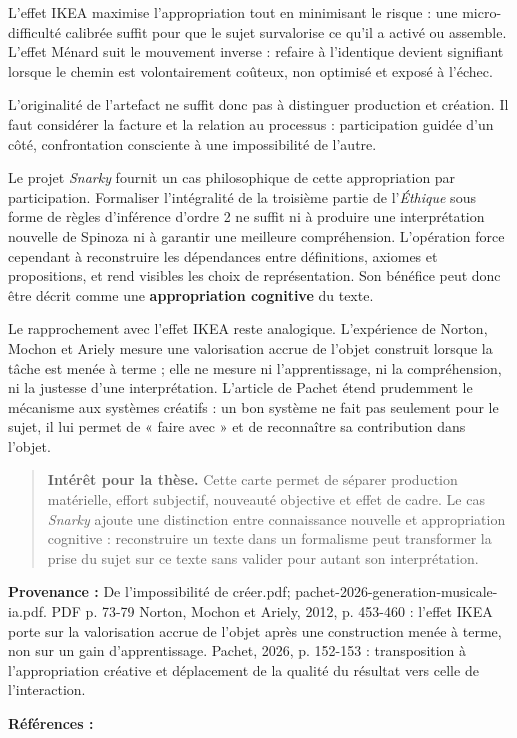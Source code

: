 \documentclass[10pt,a4paper]{article}
\begin{document}
L'effet IKEA maximise l'appropriation tout en minimisant le risque : une micro-difficulté calibrée suffit pour que le sujet survalorise ce qu'il a activé ou assemble. L'effet Ménard suit le mouvement inverse : refaire à l'identique devient signifiant lorsque le chemin est volontairement coûteux, non optimisé et exposé à l'échec.

L'originalité de l'artefact ne suffit donc pas à distinguer production et création. Il faut considérer la facture et la relation au processus : participation guidée d'un côté, confrontation consciente à une impossibilité de l'autre.

Le projet \emph{Snarky} fournit un cas philosophique de cette appropriation par participation. Formaliser l'intégralité de la troisième partie de l'\emph{Éthique} sous forme de règles d'inférence d'ordre 2 ne suffit ni à produire une interprétation nouvelle de Spinoza ni à garantir une meilleure compréhension. L'opération force cependant à reconstruire les dépendances entre définitions, axiomes et propositions, et rend visibles les choix de représentation. Son bénéfice peut donc être décrit comme une \textbf{appropriation cognitive} du texte.

Le rapprochement avec l'effet IKEA reste analogique. L'expérience de Norton, Mochon et Ariely mesure une valorisation accrue de l'objet construit lorsque la tâche est menée à terme ; elle ne mesure ni l'apprentissage, ni la compréhension, ni la justesse d'une interprétation. L'article de Pachet étend prudemment le mécanisme aux systèmes créatifs : un bon système ne fait pas seulement pour le sujet, il lui permet de « faire avec » et de reconnaître sa contribution dans l'objet.

\begin{quote}
\textbf{Intérêt pour la thèse.} Cette carte permet de séparer production matérielle, effort subjectif, nouveauté objective et effet de cadre. Le cas \emph{Snarky} ajoute une distinction entre connaissance nouvelle et appropriation cognitive : reconstruire un texte dans un formalisme peut transformer la prise du sujet sur ce texte sans valider pour autant son interprétation.
\end{quote}
{\footnotesize\color{metadata}\textbf{Provenance :} De l'impossibilité de créer.pdf; pachet-2026-generation-musicale-ia.pdf. PDF p. 73-79 Norton, Mochon et Ariely, 2012, p. 453-460 : l'effet IKEA porte sur la valorisation accrue de l'objet après une construction menée à terme, non sur un gain d'apprentissage. Pachet, 2026, p. 152-153 : transposition à l'appropriation créative et déplacement de la qualité du résultat vers celle de l'interaction.\par}
{\footnotesize\color{metadata}\textbf{Références :} \parencite{norton2012ikea,pachet2026generation}\par}
\end{document}
